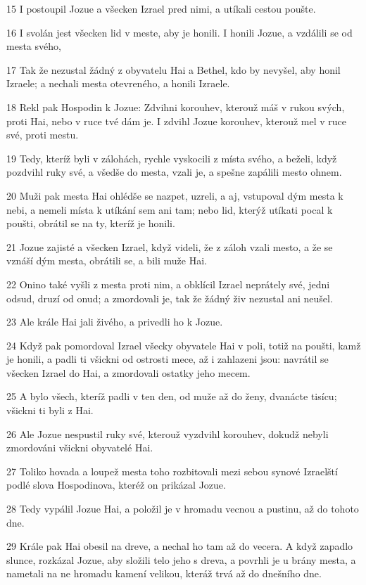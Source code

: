 \par 15 I postoupil Jozue a všecken Izrael pred nimi, a utíkali cestou poušte.
\par 16 I svolán jest všecken lid v meste, aby je honili. I honili Jozue, a vzdálili se od mesta svého,
\par 17 Tak že nezustal žádný z obyvatelu Hai a Bethel, kdo by nevyšel, aby honil Izraele; a nechali mesta otevreného, a honili Izraele.
\par 18 Rekl pak Hospodin k Jozue: Zdvihni korouhev, kterouž máš v rukou svých, proti Hai, nebo v ruce tvé dám je. I zdvihl Jozue korouhev, kterouž mel v ruce své, proti mestu.
\par 19 Tedy, kteríž byli v zálohách, rychle vyskocili z místa svého, a beželi, když pozdvihl ruky své, a všedše do mesta, vzali je, a spešne zapálili mesto ohnem.
\par 20 Muži pak mesta Hai ohlédše se nazpet, uzreli, a aj, vstupoval dým mesta k nebi, a nemeli místa k utíkání sem ani tam; nebo lid, kterýž utíkati pocal k poušti, obrátil se na ty, kteríž je honili.
\par 21 Jozue zajisté a všecken Izrael, když videli, že z záloh vzali mesto, a že se vznáší dým mesta, obrátili se, a bili muže Hai.
\par 22 Onino také vyšli z mesta proti nim, a obklícil Izrael neprátely své, jedni odsud, druzí od onud; a zmordovali je, tak že žádný živ nezustal ani neušel.
\par 23 Ale krále Hai jali živého, a privedli ho k Jozue.
\par 24 Když pak pomordoval Izrael všecky obyvatele Hai v poli, totiž na poušti, kamž je honili, a padli ti všickni od ostrosti mece, až i zahlazeni jsou: navrátil se všecken Izrael do Hai, a zmordovali ostatky jeho mecem.
\par 25 A bylo všech, kteríž padli v ten den, od muže až do ženy, dvanácte tisícu; všickni ti byli z Hai.
\par 26 Ale Jozue nespustil ruky své, kterouž vyzdvihl korouhev, dokudž nebyli zmordováni všickni obyvatelé Hai.
\par 27 Toliko hovada a loupež mesta toho rozbitovali mezi sebou synové Izraelští podlé slova Hospodinova, kteréž on prikázal Jozue.
\par 28 Tedy vypálil Jozue Hai, a položil je v hromadu vecnou a pustinu, až do tohoto dne.
\par 29 Krále pak Hai obesil na dreve, a nechal ho tam až do vecera. A když zapadlo slunce, rozkázal Jozue, aby složili telo jeho s dreva, a povrhli je u brány mesta, a nametali na ne hromadu kamení velikou, kteráž trvá až do dnešního dne.
